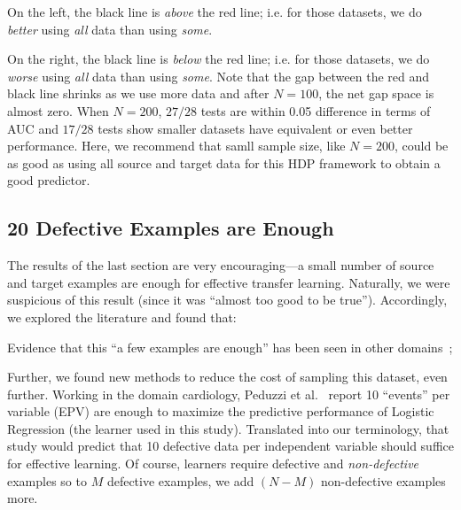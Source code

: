 \squishlist
\item
  On the left, the black line is
  {\em above} the red line; i.e. for those datasets, we do {\em better} using
  {\em all} data than using {\em some}.
  \item
On the right, the black line is {\em below} the red
line; i.e. for those datasets, we do {\em worse}
using {\em all} data than using {\em some}.
\squishend
Note that the gap between the red and black line
shrinks as we use more data and after $N=100$, the
net gap space is almost zero.  When $N=200$, $27/28$
tests are within 0.05 difference in terms of AUC and
$17/28$ tests show smaller datasets have equivalent
or even better performance. Here, we recommend that
samll sample size, like $N=200$, could be as good as using all source and target data for this HDP framework to obtain a good predictor.






\subsection{20 Defective Examples  are Enough}


The results of the last section are very encouraging---a small number of source
and target examples are enough for effective transfer learning. Naturally,
we were suspicious of this result (since it was ``almost too good to be true'').
Accordingly, we explored the literature and found that:
\squishlist
    \item Evidence that this ``a few examples are enough'' has been seen in other domains~\cite{peduzzi1996simulation}; 
    \item Further, we found new methods to reduce the cost of sampling this dataset, even further. 
\squishend
Working in the domain cardiology,
  Peduzzi et al.~\cite{peduzzi1996simulation}
  report 10 ``events'' per variable (EPV) are enough to maximize the predictive performance
  of  Logistic Regression (the learner used in this study). Translated into our terminology,
  that study would predict that  10 defective data per independent variable should
  suffice for effective learning. Of course, learners require defective and {\em non-defective}
  examples so to $M$ defective examples, we add $(N-M)$ non-defective examples more.

